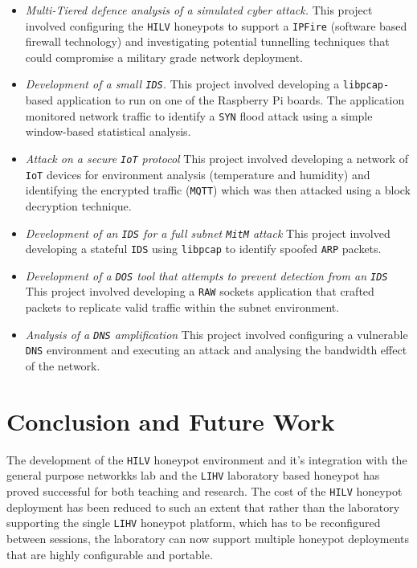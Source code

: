 \documentclass[10pt,journal]{IEEEtran}
\begin{document}
\begin{itemize} 
  \item \noindent \emph{Multi-Tiered defence analysis of a simulated cyber
    attack.} This project involved configuring the \texttt{HILV} honeypots to
    support a \texttt{IPFire} (software based firewall technology) and
    investigating potential tunnelling techniques that could compromise a
    military grade network deployment.  
  \item \noindent \emph{Development of a small \texttt{IDS}.} This project
    involved developing a \texttt{libpcap-}based application to run on one of the
    Raspberry Pi boards. The application monitored network
    traffic to identify a \texttt{SYN} flood attack using a simple window-based
    statistical analysis.  
    \item \noindent \emph{Attack on a secure \texttt{IoT} protocol} This
      project involved developing a network of \texttt{IoT} devices for
      environment analysis (temperature and humidity) and identifying the
      encrypted traffic (\texttt{MQTT}) which was then attacked using a block
      decryption technique.  
    \item \noindent \emph{Development of an \texttt{IDS} for a full subnet
      \texttt{MitM} attack} This project involved developing a stateful 
      \texttt{IDS} using \texttt{libpcap} to identify spoofed \texttt{ARP} packets.  
    \item \noindent \emph{Development of a \texttt{DOS} tool that attempts to
      prevent detection from an \texttt{IDS}} This project involved developing
      a \texttt{RAW} sockets application that crafted packets to
      replicate valid traffic within the subnet environment.  
     \item \noindent \emph{Analysis of a \texttt{DNS} amplification} This
       project involved configuring a vulnerable \texttt{DNS} environment and
       executing an attack and analysing the bandwidth effect of the network.
\end{itemize}

\section{Conclusion and Future Work\label{sec:ConclusionFuture}}

The development of the \texttt{HILV} honeypot environment and it's integration with the general purpose networkks lab and the \texttt{LIHV} laboratory based honeypot has proved successful
for both teaching and research. The cost of the \texttt{HILV} honeypot deployment has been reduced
to such an extent that rather than the laboratory supporting the single \texttt{LIHV} honeypot
platform, which has to be reconfigured between sessions, the laboratory can now
support multiple honeypot deployments that are highly configurable and
portable.
\end{document}
